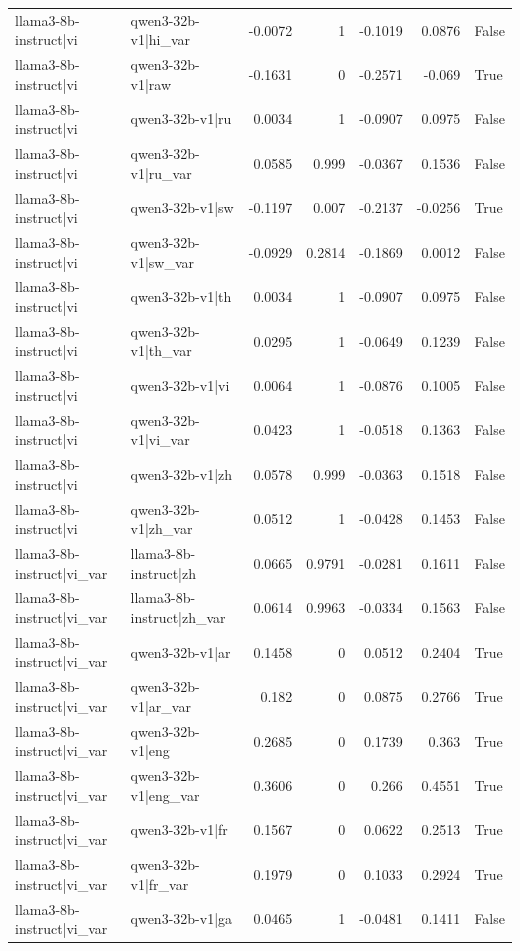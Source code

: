 \begin{table}
\begin{tabular}{l l r r r r l}
llama3-8b-instruct|vi & qwen3-32b-v1|hi_var & -0.0072 & 1 & -0.1019 & 0.0876 & False \\
llama3-8b-instruct|vi & qwen3-32b-v1|raw & -0.1631 & 0 & -0.2571 & -0.069 & True \\
llama3-8b-instruct|vi & qwen3-32b-v1|ru & 0.0034 & 1 & -0.0907 & 0.0975 & False \\
llama3-8b-instruct|vi & qwen3-32b-v1|ru_var & 0.0585 & 0.999 & -0.0367 & 0.1536 & False \\
llama3-8b-instruct|vi & qwen3-32b-v1|sw & -0.1197 & 0.007 & -0.2137 & -0.0256 & True \\
llama3-8b-instruct|vi & qwen3-32b-v1|sw_var & -0.0929 & 0.2814 & -0.1869 & 0.0012 & False \\
llama3-8b-instruct|vi & qwen3-32b-v1|th & 0.0034 & 1 & -0.0907 & 0.0975 & False \\
llama3-8b-instruct|vi & qwen3-32b-v1|th_var & 0.0295 & 1 & -0.0649 & 0.1239 & False \\
llama3-8b-instruct|vi & qwen3-32b-v1|vi & 0.0064 & 1 & -0.0876 & 0.1005 & False \\
llama3-8b-instruct|vi & qwen3-32b-v1|vi_var & 0.0423 & 1 & -0.0518 & 0.1363 & False \\
llama3-8b-instruct|vi & qwen3-32b-v1|zh & 0.0578 & 0.999 & -0.0363 & 0.1518 & False \\
llama3-8b-instruct|vi & qwen3-32b-v1|zh_var & 0.0512 & 1 & -0.0428 & 0.1453 & False \\
llama3-8b-instruct|vi_var & llama3-8b-instruct|zh & 0.0665 & 0.9791 & -0.0281 & 0.1611 & False \\
llama3-8b-instruct|vi_var & llama3-8b-instruct|zh_var & 0.0614 & 0.9963 & -0.0334 & 0.1563 & False \\
llama3-8b-instruct|vi_var & qwen3-32b-v1|ar & 0.1458 & 0 & 0.0512 & 0.2404 & True \\
llama3-8b-instruct|vi_var & qwen3-32b-v1|ar_var & 0.182 & 0 & 0.0875 & 0.2766 & True \\
llama3-8b-instruct|vi_var & qwen3-32b-v1|eng & 0.2685 & 0 & 0.1739 & 0.363 & True \\
llama3-8b-instruct|vi_var & qwen3-32b-v1|eng_var & 0.3606 & 0 & 0.266 & 0.4551 & True \\
llama3-8b-instruct|vi_var & qwen3-32b-v1|fr & 0.1567 & 0 & 0.0622 & 0.2513 & True \\
llama3-8b-instruct|vi_var & qwen3-32b-v1|fr_var & 0.1979 & 0 & 0.1033 & 0.2924 & True \\
llama3-8b-instruct|vi_var & qwen3-32b-v1|ga & 0.0465 & 1 & -0.0481 & 0.1411 & False \\

\end{tabular}
\end{table}

